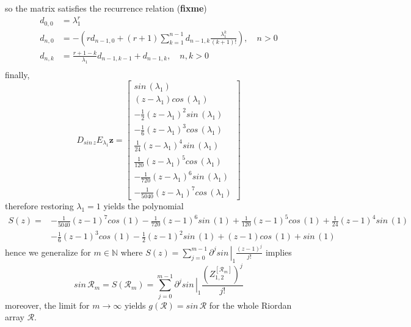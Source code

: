 so the matrix satisfies the recurrence relation (\textbf{fixme})
\begin{displaymath}
\begin{split}
d_{0,0}&=\lambda_{1}^{r}\\
d_{n,0}&=-\left(r d_{n-1, 0} + (r+1)\sum_{k=1}^{n-1}{d_{n-1, k}\frac{\lambda_{1}^{k}}{(k+1)!}}\right), \quad n>0 \\
d_{n,k}&=\frac{r+1-k}{\lambda_{1}}d_{n-1, k-1} + d_{n-1,k}, \quad n,k > 0\\
\end{split}
\end{displaymath}
finally,
\begin{displaymath}
D_{sin\,{z}}E_{\lambda_{1}}\boldsymbol{z} = \left[\begin{matrix}sin\,{\left (\lambda_{1} \right )}\\\left(z - \lambda_{1}\right) cos\,{\left (\lambda_{1} \right )}\\- \frac{1}{2} \left(z - \lambda_{1}\right)^{2} sin\,{\left (\lambda_{1} \right )}\\- \frac{1}{6} \left(z - \lambda_{1}\right)^{3} cos\,{\left (\lambda_{1} \right )}\\\frac{1}{24} \left(z - \lambda_{1}\right)^{4} sin\,{\left (\lambda_{1} \right )}\\\frac{1}{120} \left(z - \lambda_{1}\right)^{5} cos\,{\left (\lambda_{1} \right )}\\- \frac{1}{720} \left(z - \lambda_{1}\right)^{6} sin\,{\left (\lambda_{1} \right )}\\- \frac{1}{5040} \left(z - \lambda_{1}\right)^{7} cos\,{\left (\lambda_{1} \right )}\end{matrix}\right]
\end{displaymath}
therefore restoring $\lambda_{1}=1$ yields the polynomial
\begin{displaymath}
\begin{split}
S{\left (z \right )} = &- \frac{1}{5040} \left(z - 1\right)^{7} cos\,{\left (1 \right )} - \frac{1}{720} \left(z - 1\right)^{6} sin\,{\left (1 \right )} + \frac{1}{120} \left(z - 1\right)^{5} cos\,{\left (1 \right )} + \frac{1}{24} \left(z - 1\right)^{4} sin\,{\left (1 \right )} \\
                       &- \frac{1}{6} \left(z - 1\right)^{3} cos\,{\left (1 \right )} - \frac{1}{2} \left(z - 1\right)^{2} sin\,{\left (1 \right )} + \left(z - 1\right) cos\,{\left (1 \right )} + sin\,{\left (1 \right )}
\end{split}
\end{displaymath}
hence we generalize for $m\in\mathbb{N}$ where $S(z) = \sum_{j=0}^{m-1}{\left.{\partial^{j} sin\,}\right|_{1} \frac{(z-1)^{j}}{j!}}$ implies
\begin{displaymath}
sin\,{\mathcal{R}_{m}} = S{\left (\mathcal{R}_{m} \right )} = \sum_{j=0}^{m-1}{\left.{\partial^{j} sin\,}\right|_{1} \frac{{\left(Z_{1,2}^{\left[\mathcal{R}_{m}\right]}\right)}^{j}}{j!}}
\end{displaymath}
moreover, the limit for $m \rightarrow \infty$ yields $ g{\left (\mathcal{R}
\right )} = sin\,{\mathcal{R}} $ for the whole Riordan array $\mathcal{R}$.
\fi

